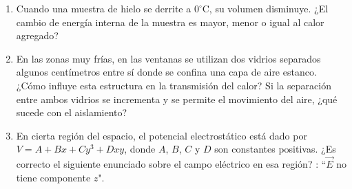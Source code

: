 \documentclass[a4paper,11pt,dvipsnames, twocolumn]{article}
\begin{document}
\begin{enumerate}[label=\roman*., wide, labelwidth=!, labelindent=0pt]

    \item Cuando una muestra de hielo se derrite a $0^\circ\text{C}$, su volumen disminuye. ¿El cambio de energía interna de la muestra es mayor, menor o igual al calor agregado?
    \item En las zonas muy frías, en las ventanas se utilizan dos vidrios separados algunos centímetros entre sí donde se confina una capa de aire estanco. ¿Cómo influye esta estructura en la transmisión del calor? Si la separación entre ambos vidrios se incrementa y se permite el movimiento del aire, ¿qué sucede con el aislamiento?
    \item En cierta región del espacio, el potencial electrostático está dado por $V = A + Bx + Cy^3 + Dxy$, donde $A$, $B$, $C$ y $D$ son constantes positivas. ¿Es correcto el siguiente enunciado sobre el campo eléctrico en esa región? : ``$\vec{E}$ no tiene componente $z$".

\end{enumerate}
\end{document}
